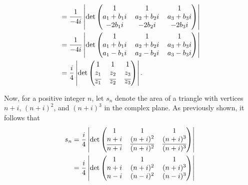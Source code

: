 \documentclass[9pt]{article}
\begin{document}
\begin{enumerate}
\begin{align*}
           &= \frac{1}{-4i}\left|\det\left(\begin{tabular}{@{}ccc@{}}
                  1 & 1 & 1 \\
                  $a_1+b_1i$ & $a_2+b_2i$ & $a_3+b_3i$ \\
                  $-2b_1i$ & $-2b_2i$ & $-2b_3i$
              \end{tabular}\right)\right| \\
           &= \frac{1}{-4i}\left|\det\left(\begin{tabular}{@{}ccc@{}}
                  1 & 1 & 1 \\
                  $a_1+b_1i$ & $a_2+b_2i$ & $a_3+b_3i$ \\
                  $a_1-b_1i$ & $a_2-b_2i$ & $a_3-b_3i$
              \end{tabular}\right)\right| \\
           &= \frac{i}{4}\left|\det\left(\begin{tabular}{@{}ccc@{}}
                  1 & 1 & 1 \\
                  $z_1$ & $z_2$ & $z_3$ \\
                  $\overline{z_1}$ & $\overline{z_2}$ & $\overline{z_3}$
              \end{tabular}\right)\right|.
      \end{align*}

      Now, for a positive integer $n$, let $s_n$ denote the area of a triangle 
      with vertices $n + i$, $(n + i)^2$, and $(n + i)^3$ in the complex plane.
      As previously shown, it follows that
      \begin{align*}
         s_n &= \frac{i}{4}\left|\det\left(\begin{tabular}{@{}ccc@{}}
                   1 & 1 & 1 \\
                   $n+i$ & $(n+i)^2$ & $(n+i)^3$ \\
                   $\overline{n+i}$& $\overline{(n+i)^2}$ & $\overline{(n+i)^3}$
                \end{tabular}\right)\right| \\
             &= \frac{i}{4}\left|\det\left(\begin{tabular}{@{}ccc@{}}
                   1 & 1 & 1 \\
                   $n+i$ & $(n+i)^2$ & $(n+i)^3$ \\
                   $n-i$ & $(n-i)^2$ & $(n-i)^3$
                \end{tabular}\right)\right| \\
      \end{align*}
\end{enumerate}
\end{document}
